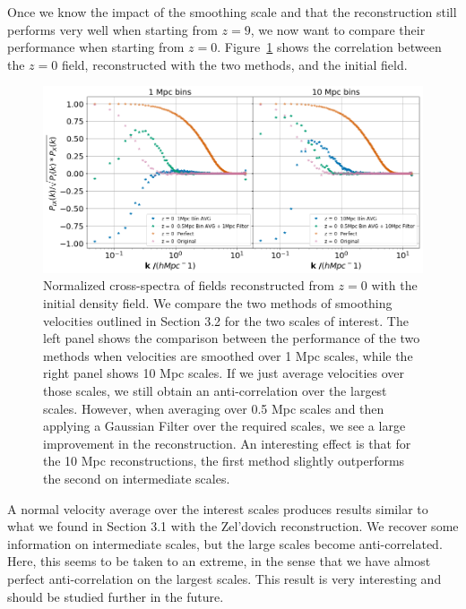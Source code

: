 Once we know the impact of the smoothing scale and that the reconstruction still performs very well when starting from $z=9$, we now want to compare their performance when starting from $z=0$. Figure~\ref{fig:4.3} shows the correlation between the $z=0$ field, reconstructed with the two methods, and the initial field. 

\begin{figure}
    \centering
    \includegraphics[width=1\columnwidth]{images/realRecon/filterComp.png}%
    
    \caption{
        Normalized cross-spectra of fields reconstructed from $z=0$ with the initial density field. We compare the two methods of smoothing velocities outlined in Section 3.2 for the two scales of interest. The left panel shows the comparison between the performance of the two methods when velocities are smoothed over 1 Mpc scales, while the right panel shows 10 Mpc scales. If we just average velocities over those scales, we still obtain an anti-correlation over the largest scales. However, when averaging over 0.5 Mpc scales and then applying a Gaussian Filter over the required scales, we see a large improvement in the reconstruction. An interesting effect is that for the 10 Mpc reconstructions, the first method slightly outperforms the second on intermediate scales. 
    }
    
    \label{fig:4.3}
\end{figure}

A normal velocity average over the interest scales produces results similar to what we found in Section 3.1 with the Zel'dovich reconstruction. We recover some information on intermediate scales, but the large scales become anti-correlated. Here, this seems to be taken to an extreme, in the sense that we have almost perfect anti-correlation on the largest scales. This result is very interesting and should be studied further in the future.


